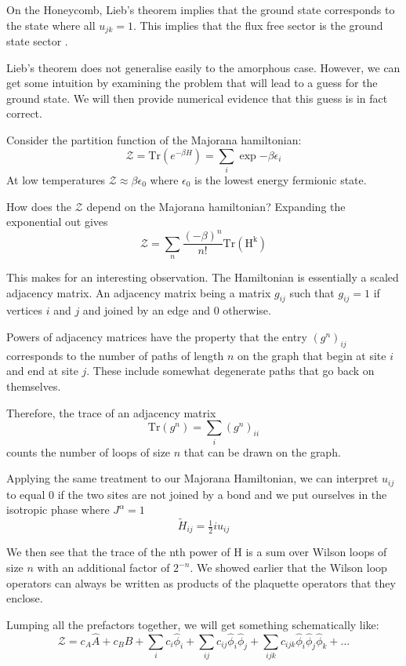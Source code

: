 On the Honeycomb, Lieb's theorem implies that the ground state corresponds to the state where all \(u_{jk} = 1\). This implies that the flux free sector is the ground state sector \autocite{lieb_flux_1994}.

Lieb's theorem does not generalise easily to the amorphous case. However, we can get some intuition by examining the problem that will lead to a guess for the ground state. We will then provide numerical evidence that this guess is in fact correct.

Consider the partition function of the Majorana hamiltonian: \[ \mathcal{Z} = \mathrm{Tr}\left( e^{-\beta H}\right) = \sum_i \exp{-\beta \epsilon_i}\] At low temperatures \(\mathcal{Z} \approx \beta \epsilon_0\) where \(\epsilon_0\) is the lowest energy fermionic state.

How does the \(\mathcal{Z}\) depend on the Majorana hamiltonian? Expanding the exponential out gives \[ \mathcal{Z} = \sum_n \frac{(-\beta)^n}{n!} \mathrm{Tr(H^k)} \]

This makes for an interesting observation. The Hamiltonian is essentially a scaled adjacency matrix. An adjacency matrix being a matrix \(g_{ij}\) such that \(g_{ij} = 1\) if vertices \(i\) and \(j\) and joined by an edge and 0 otherwise.

Powers of adjacency matrices have the property that the entry \((g^n)_{ij}\) corresponds to the number of paths of length \(n\) on the graph that begin at site \(i\) and end at site \(j\). These include somewhat degenerate paths that go back on themselves.

Therefore, the trace of an adjacency matrix \[\mathrm{Tr}(g^n) = \sum_i (g^n)_{ii}\] counts the number of loops of size \(n\) that can be drawn on the graph.

Applying the same treatment to our Majorana Hamiltonian, we can interpret \(u_{ij}\) to equal 0 if the two sites are not joined by a bond and we put ourselves in the isotropic phase where \(J^\alpha = 1\) \[ \tilde{H}_{ij} =  \tfrac{1}{2} i u_{ij}\]

We then see that the trace of the nth power of H is a sum over Wilson loops of size \(n\) with an additional factor of \(2^{-n}\). We showed earlier that the Wilson loop operators can always be written as products of the plaquette operators that they enclose.

Lumping all the prefactors together, we will get something schematically like: \[ \mathcal{Z} = c_A \hat{A} + c_B \hat{B} + \sum_i c_i \hat{\phi}_i + \sum_{ij} c_{ij}  \hat{\phi}_i \hat{\phi}_j + \sum_{ijk} c_{ijk}  \hat{\phi}_i \hat{\phi}_j \hat{\phi}_k + ...\]

